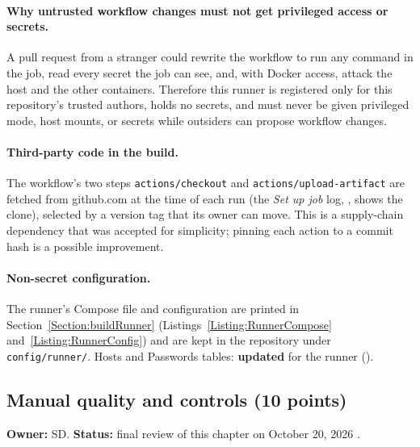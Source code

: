 \paragraph{Why untrusted workflow changes must not get privileged access or secrets.}
A pull request from a stranger could rewrite the workflow to run any command in the job, read every secret the
job can see, and, with Docker access, attack the host and the other containers. Therefore this runner is
registered only for this repository's trusted authors, holds no secrets, and must never be given privileged mode,
host mounts, or secrets while outsiders can propose workflow changes.

\paragraph{Third-party code in the build.}
The workflow's two steps \texttt{actions/checkout} and \texttt{actions/upload-artifact} are fetched from
github.com at the time of each run (the \emph{Set up job} log, , shows the clone), selected by a version
tag that its owner can move. This is a supply-chain dependency that was accepted for simplicity; pinning each
action to a commit hash is a possible improvement.

\paragraph{Non-secret configuration.}
The runner's Compose file and configuration are printed in Section~\ref{Section:buildRunner}
(Listings~\ref{Listing:RunnerCompose} and~\ref{Listing:RunnerConfig}) and are kept in the repository under
\texttt{config/runner/}. Hosts and Passwords tables: \textbf{updated} for the runner ().

\subsection{Manual quality and controls (10 points)}
\label{Section:buildManualQuality}
\textbf{Owner:} SD. \textbf{Status:} final review of this chapter on
October 20, 2026 \StatusPass.

